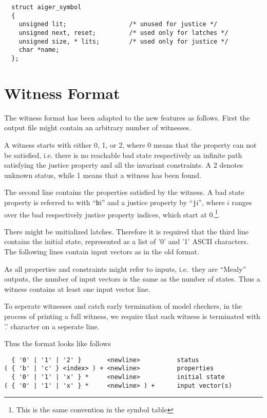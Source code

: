 \documentclass{llncs}
\begin{document}
{\small
\begin{verbatim}
  struct aiger_symbol
  {
    unsigned lit;                 /* unused for justice */
    unsigned next, reset;         /* used only for latches */
    unsigned size, * lits;        /* used only for justice */
    char *name;
  };
\end{verbatim}}

\section{Witness Format}

The witness format has been adapted to the new features as follows.
First the output file might contain an arbitrary number of witnesses.

A witness starts with either 0, 1, or 2, where 0 means that the property can
not be satisfied, i.e. there is no reachable bad state respectively an
infinite path satisfying the justice property and all the invariant
constraints.  A 2 denotes unknown status, while 1 means that a witness
has been found.

The second line contains the properties satisfied by the witness.
A bad state property is referred to with ``\texttt{b}i'' and a
justice property by ``\texttt{j}i'', where $i$ ranges over the bad
respectively justice property indices, which start at 0.\footnote{This is 
the same convention in the symbol table}.

There might be unitialized latches.  Therefore it is required that the third
line contains the initial state, represented as a list of '0' and '1' ASCII
characters.  The following lines contain input vectors as in the old format.

As all properties and constraints might refer to inputs, i.e.~they are ``Mealy''
outputs, the number of input vectors is the same as the number of states.
Thus a witness contains at least one input vector line.

To seperate witnesses and catch early termination of model checkers, in the
process of printing a full witness, we require that each witness is
terminated with '.' character on a seperate line.

Thus the format looks like follows
{\small
\begin{verbatim}
  { '0' | '1' | '2' }       <newline>          status
( { 'b' | 'c' } <index> ) + <newline>          properties
  { '0' | '1' | 'x' } *     <newline>          initial state
( { '0' | '1' | 'x' } *     <newline> ) +      input vector(s)
\end{verbatim}}
\end{document}
